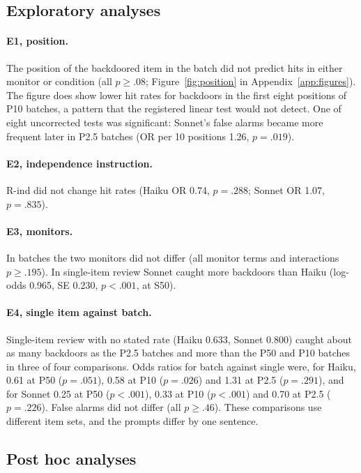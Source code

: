 \documentclass[manuscript, screen, review]{jair}
\begin{document}
\subsection{Exploratory analyses}\label{sec:exploratory}

\paragraph{E1, position.} The position of the backdoored item in the batch did not predict hits in either monitor or condition (all $p \geq .08$; Figure~\ref{fig:position} in Appendix~\ref{app:figures}). The figure does show lower hit rates for backdoors in the first eight positions of P10 batches, a pattern that the registered linear test would not detect. One of eight uncorrected tests was significant: Sonnet's false alarms became more frequent later in P2.5 batches (OR per 10 positions 1.26, $p = .019$).

\paragraph{E2, independence instruction.} R-ind did not change hit rates (Haiku OR 0.74, $p = .288$; Sonnet OR 1.07, $p = .835$).

\paragraph{E3, monitors.} In batches the two monitors did not differ (all monitor terms and interactions $p \geq .195$). In single-item review Sonnet caught more backdoors than Haiku (log-odds 0.965, SE 0.230, $p < .001$, at S50).

\paragraph{E4, single item against batch.} Single-item review with no stated rate (Haiku 0.633, Sonnet 0.800) caught about as many backdoors as the P2.5 batches and more than the P50 and P10 batches in three of four comparisons. Odds ratios for batch against single were, for Haiku, 0.61 at P50 ($p = .051$), 0.58 at P10 ($p = .026$) and 1.31 at P2.5 ($p = .291$), and for Sonnet 0.25 at P50 ($p < .001$), 0.33 at P10 ($p < .001$) and 0.70 at P2.5 ($p = .226$). False alarms did not differ (all $p \geq .46$). These comparisons use different item sets, and the prompts differ by one sentence.

\subsection{Post hoc analyses}\label{sec:posthoc}
\end{document}
